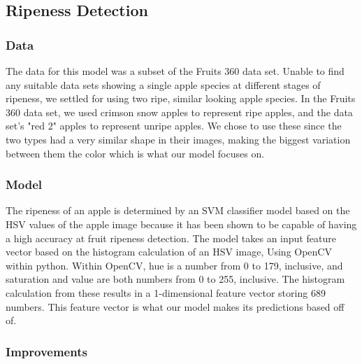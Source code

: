 \subsection{Ripeness Detection}
\subsubsection{Data}
The data for this model was a subset of the Fruits 360 data set. %
Unable to find any suitable data sets showing a single apple species at different stages of ripeness, we settled for using two ripe, similar looking apple species.
In the Fruits 360 data set, we used crimson snow apples to represent ripe apples, and the data set's "red 2" apples to represent unripe apples. We  chose to use these since the two types had a very similar shape in their images, making the biggest variation between them the color which is what our model focuses on.

\subsubsection{Model}
The ripeness of an apple is determined by an SVM classifier model based on the HSV values of the apple image because it has been shown to be capable of having a high accuracy at fruit ripeness detection. %
The model takes an input feature vector based on the histogram calculation of an HSV image, Using OpenCV within python.
Within OpenCV, hue is a number from 0 to 179, inclusive, and saturation and value are both numbers from 0 to 255, inclusive.
The histogram calculation from these results in a 1-dimensional feature vector storing 689 numbers. 
This feature vector is what our model makes its predictions based off of.


\subsubsection{Improvements}
